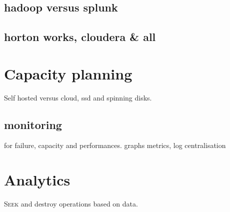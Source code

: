 \documentclass[a4paper,12pt]{article}
\begin{document}
\subsection{hadoop versus splunk}
\subsection{horton works, cloudera \& all}
\section{Capacity planning}
Self hosted versus cloud, ssd and spinning disks.
\subsection{monitoring}
for failure, capacity and performances.
graphs metrics, log centralisation
\section{Analytics}
\lettrine{S}{eek} and destroy operations based on data.
\end{document}
